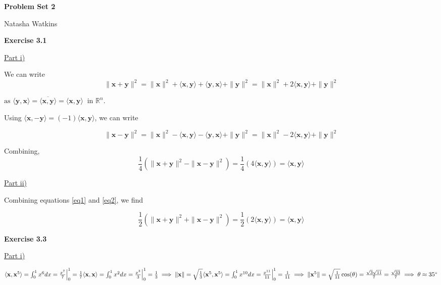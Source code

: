 \documentclass[letterpaper,12pt]{article}
\newcommand{\vect}[1]{\mathbf{#1}}
\begin{document}
\textbf{\large Problem Set 2}

Natasha Watkins

\vspace{5mm}

\textbf{Exercise 3.1}

\underline{Part i)}

We can write
\begin{equation}
  \label{eq1}
\| \vect{x} + \vect{y} \|^2 = \| \vect{x} \|^2 + \langle \vect{x}, \vect{y} \rangle +
\langle \vect{y}, \vect{x} \rangle + \| \vect{y} \|^2
= \| \vect{x} \|^2 + 2 \langle \vect{x}, \vect{y} \rangle + \| \vect{y} \|^2 
\end{equation}

\begin{math}
\text{as } \langle \vect{y}, \vect{x} \rangle 
= \overline{\langle \vect{x}, \vect{y} \rangle}
= \langle \vect{x}, \vect{y} \rangle \ \text{ in } \mathbb R^n.
\end{math}

Using $\langle \vect{x}, \vect{-y} \rangle = (-1)\langle \vect{x}, \vect{y} \rangle$, we can write

\begin{equation}
  \label{eq2}
\| \vect{x} - \vect{y} \|^2 = \| \vect{x} \|^2 - \langle \vect{x}, \vect{y} \rangle -
\langle \vect{y}, \vect{x} \rangle + \| \vect{y} \|^2
= \| \vect{x} \|^2 - 2 \langle \vect{x}, \vect{y} \rangle + \| \vect{y} \|^2 
\end{equation}

Combining,
\begin{equation*}
  \frac{1}{4} (\| \vect{x} + \vect{y} \|^2 - \| \vect{x} - \vect{y} \|^2)
  = \frac{1}{4}(4 \langle \vect{x}, \vect{y} \rangle) = \langle \vect{x}, \vect{y} \rangle
\end{equation*}

\underline{Part ii)}

Combining equations \ref{eq1} and \ref{eq2}, we find

\begin{equation*}
  \frac{1}{2} (\| \vect{x} + \vect{y} \|^2 + \| \vect{x} - \vect{y} \|^2)
  = \frac{1}{2}(2 \langle \vect{x}, \vect{y} \rangle) = \langle \vect{x}, \vect{y} \rangle
\end{equation*}

\textbf{Exercise 3.3}

\underline{Part i)}

\begin{math}
  \langle \vect{x}, \vect{x}^5 \rangle = \int_0^1 x^6 dx = \frac{x^7}{7} \Big|_0^1 = \frac{1}{7} \\
  \langle \vect{x}, \vect{x} \rangle = \int_0^1 x^2 dx = \frac{x^3}{3} \Big|_0^1 = \frac{1}{3} 
  \implies \|\vect{x}\| = \sqrt{\frac{1}{3}} \\
  \langle \vect{x}^5, \vect{x}^5 \rangle = \int_0^1 x^{10} dx = \frac{x^{11}}{11} \Big|_0^{1} = \frac{1}{11} \implies \|\vect{x}^5\| = \sqrt{\frac{1}{11}} \\
  
  \cos(\theta) = \frac{\sqrt{3} \sqrt{11}}{7} = \frac{\sqrt{33}}{7}
  \implies \theta \approx 35 \degree
  
\end{math}
  
\end{document}
